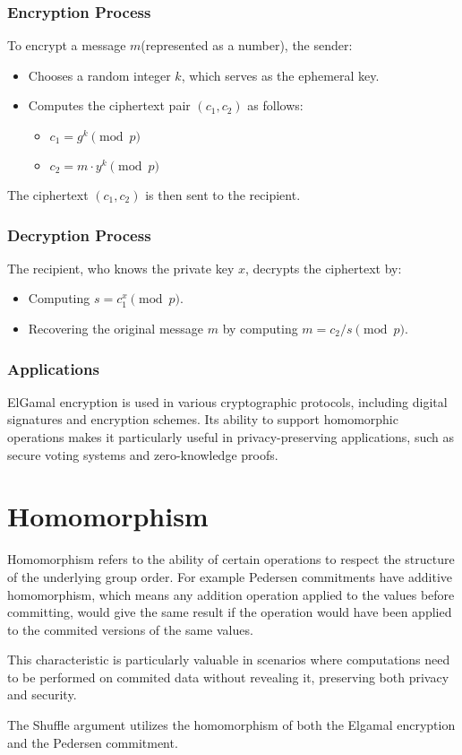\documentclass[12pt,a4paper]{report}
\begin{document}
\subsubsection*{Encryption Process}
To encrypt a message $m$(represented as a number), the sender:
\begin{itemize}
	\item Chooses a random integer $k$, which serves as the ephemeral key.
	\item Computes the ciphertext pair $(c_1, c_2)$ as follows:
		\begin{itemize}
			\item $c_1 = g^k \pmod p$
			\item $c_2 = m \cdot y^k \pmod p$
		\end{itemize}
\end{itemize}
The ciphertext $(c_1, c_2)$ is then sent to the recipient.
\subsubsection{Decryption Process}
The recipient, who knows the private key $x$, decrypts the ciphertext by:
\begin{itemize}
	\item Computing $s = c_{1}^{x} \pmod p$.
	\item Recovering the original message $m$ by computing $m = c_2 / s \pmod p$.
\end{itemize}
\subsubsection{Applications}
ElGamal encryption is used in various cryptographic protocols, including digital signatures and encryption schemes. 
Its ability to support homomorphic operations makes it particularly useful in privacy-preserving applications, 
such as secure voting systems and zero-knowledge proofs.
\section{Homomorphism}
Homomorphism refers to the ability of certain operations to respect the structure of the underlying group order. 
For example Pedersen commitments have additive homomorphism, which means any addition operation applied to the values before committing, would give the same result if the operation would have been applied to the commited versions of the same values.\par   
This characteristic is particularly valuable in scenarios where computations need to be performed on commited data without revealing it, preserving both privacy and security.\par
The Shuffle argument utilizes the homomorphism of both the Elgamal encryption and the Pedersen commitment.
\end{document}

